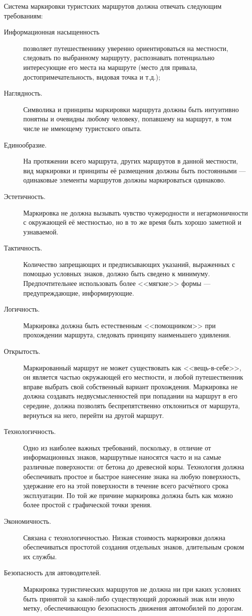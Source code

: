 \documentclass[a4paper,12pt]{extarticle}
\begin{document}
Система маркировки туристских маршрутов должна отвечать следующим требованиям:
\begin{description}
	\item[Информационная насыщенность] позволяет путешественнику уверенно ориентироваться на местности, следовать по
		выбранному маршруту, распознавать потенциально интересующие его места на маршруте (место для привала,
		достопримечательность, видовая точка и т.д.);
	\item[Наглядность.] Символика и принципы маркировки маршрута должны быть интуитивно понятны и очевидны любому
		человеку, попавшему на маршрут, в том числе не имеющему туристского опыта.
	\item[Единообразие.] На протяжении всего маршрута, других маршрутов в данной местности, вид маркировки и
		принципы её размещения должны быть постоянными --- одинаковые элементы маршрутов должны маркироваться
		одинаково.
	\item[Эстетичность.] Маркировка не должна вызывать чувство чужеродности и негармоничности с окружающей её
		местностью, но в то же время быть хорошо заметной и узнаваемой.
	\item[Тактичность.] Количество запрещающих и предписывающих указаний, выраженных с помощью условных знаков,
		должно быть сведено к минимуму. Предпочтительнее использовать более <<мягкие>> формы ---
		предупреждающие, информирующие.
	\item[Логичность.] Маркировка должна быть естественным <<помощником>> при прохождении маршрута, следовать
		принципу наименьшего удивления.
	\item[Открытость.] Маркированный маршрут не может существовать как <<вещь-в-себе>>, он является частью окружающей
		его местности, и любой путешественник вправе выбрать свой собственный вариант прохождения. Маркировка не
		должна создавать недвусмысленностей при попадании на маршрут в его середине, должна позволять
		беспрепятственно отклониться от маршрута, вернуться на него, перейти на другой маршрут.
	\item[Технологичность.] Одно из наиболее важных требований, поскольку, в отличие от информационных знаков,
		маршрутные наносятся часто и на самые различные поверхности: от бетона до древесной коры.
		Технология должна обеспечивать простое и быстрое нанесение знака на любую поверхность, удержание его на
		этой поверхности в течение всего расчётного срока эксплуатации. По той же причине маркировка должна
		быть как можно более простой с графической точки зрения.
	\item[Экономичность.] Связана с технологичностью. Низкая стоимость маркировки должна обеспечиваться простотой
		создания отдельных знаков, длительным сроком их службы.
	\item[Безопасность для автоводителей.] Маркировка туристических маршрутов не должна ни при каких условиях быть
		принятой за какой-либо существующий дорожный знак или иную метку, обеспечивающую безопасность движения
		автомобилей по дорогам.
\end{description}
\end{document}
